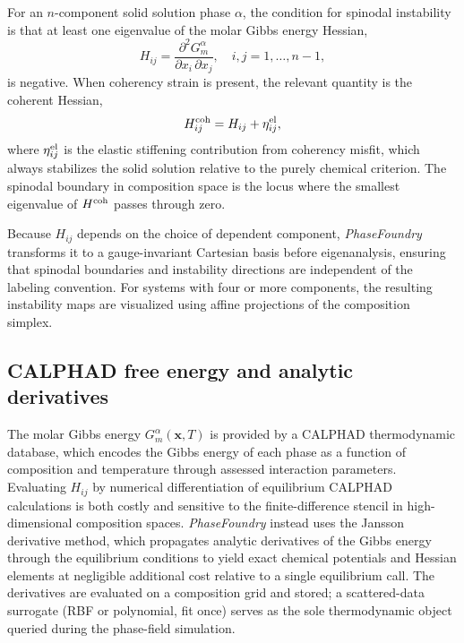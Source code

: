 \documentclass[12pt]{article}
\begin{document}
For an $n$-component solid solution phase $\alpha$, the condition for spinodal instability is that at least one eigenvalue of the molar Gibbs energy Hessian,
\begin{equation}
  H_{ij} = \frac{\partial^2 G_m^\alpha}{\partial x_i \,\partial x_j}, \quad i,j = 1,\ldots,n-1,
\end{equation}
is negative.\cite{cahn1961spinodal,de1972analysis} When coherency strain is present, the relevant quantity is the coherent Hessian,\cite{cahn1961spinodal}
\begin{equation}
  H_{ij}^{\rm coh} = H_{ij} + \eta_{ij}^{\rm el},
\end{equation}
where $\eta_{ij}^{\rm el}$ is the elastic stiffening contribution from coherency misfit, which always stabilizes the solid solution relative to the purely chemical criterion. The spinodal boundary in composition space is the locus where the smallest eigenvalue of $H^{\rm coh}$ passes through zero.

Because $H_{ij}$ depends on the choice of dependent component, \textit{PhaseFoundry} transforms it to a gauge-invariant Cartesian basis before eigenanalysis,\cite{kadirvel2022exploration,morral2021stability} ensuring that spinodal boundaries and instability directions are independent of the labeling convention. For systems with four or more components, the resulting instability maps are visualized using affine projections of the composition simplex.\cite{vela2025visualizing}

\subsection{CALPHAD free energy and analytic derivatives}

The molar Gibbs energy $G_m^\alpha(\mathbf{x}, T)$ is provided by a CALPHAD thermodynamic database, which encodes the Gibbs energy of each phase as a function of composition and temperature through assessed interaction parameters.\cite{lukas2007computational} Evaluating $H_{ij}$ by numerical differentiation of equilibrium CALPHAD calculations is both costly and sensitive to the finite-difference stencil in high-dimensional composition spaces.\cite{kunselman2024analytically} \textit{PhaseFoundry} instead uses the Jansson derivative method,\cite{kunselman2024analytically} which propagates analytic derivatives of the Gibbs energy through the equilibrium conditions to yield exact chemical potentials and Hessian elements at negligible additional cost relative to a single equilibrium call. The derivatives are evaluated on a composition grid and stored; a scattered-data surrogate (RBF or polynomial, fit once) serves as the sole thermodynamic object queried during the phase-field simulation.
\end{document}
